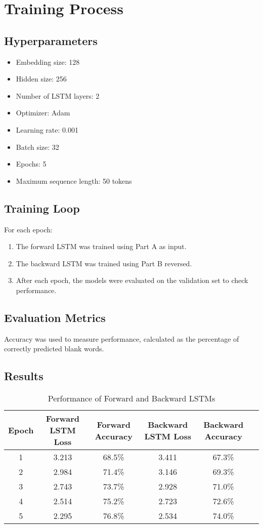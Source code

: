 \documentclass{article}
\begin{document}
\section{Training Process}
\subsection{Hyperparameters}
\begin{itemize}
    \item Embedding size: 128
    \item Hidden size: 256
    \item Number of LSTM layers: 2
    \item Optimizer: Adam
    \item Learning rate: 0.001
    \item Batch size: 32
    \item Epochs: 5
    \item Maximum sequence length: 50 tokens
\end{itemize}

\subsection{Training Loop}
For each epoch:
\begin{enumerate}
    \item The forward LSTM was trained using Part A as input.
    \item The backward LSTM was trained using Part B reversed.
    \item After each epoch, the models were evaluated on the validation set to check performance.
\end{enumerate}

\subsection{Evaluation Metrics}
Accuracy was used to measure performance, calculated as the percentage of correctly predicted blank words.

\subsection{Results}
\begin{table}[h!]
\centering
\begin{tabular}{@{}cccccc@{}}
\toprule
\textbf{Epoch} & \textbf{Forward LSTM Loss} & \textbf{Forward Accuracy} & \textbf{Backward LSTM Loss} & \textbf{Backward Accuracy} \\ \midrule
1 & 3.213 & 68.5\% & 3.411 & 67.3\% \\
2 & 2.984 & 71.4\% & 3.146 & 69.3\% \\
3 & 2.743 & 73.7\% & 2.928 & 71.0\% \\
4 & 2.514 & 75.2\% & 2.723 & 72.6\% \\
5 & 2.295 & 76.8\% & 2.534 & 74.0\% \\ \bottomrule
\end{tabular}
\caption{Performance of Forward and Backward LSTMs}
\end{table}
\end{document}

